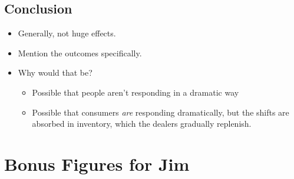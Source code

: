 \documentclass[11pt,letterpaper,oneside]{article}
\begin{document}
\begin{doublespacing}
\section{Conclusion}

\begin{itemize}
    \item Generally, not huge effects.
    \item Mention the outcomes specifically.
    \item Why would that be?
    \begin{itemize}
        \item Possible that people aren't responding in a dramatic way
        \item Possible that consumers \emph{are} responding dramatically, but the shifts are absorbed in inventory, which the dealers gradually replenish.

    \end{itemize}
\end{itemize}



%
%




\end{doublespacing}
\FloatBarrier
\pagebreak
\printbibliography
\pagebreak


\appendix

\section{Bonus Figures for Jim}
\end{document}
